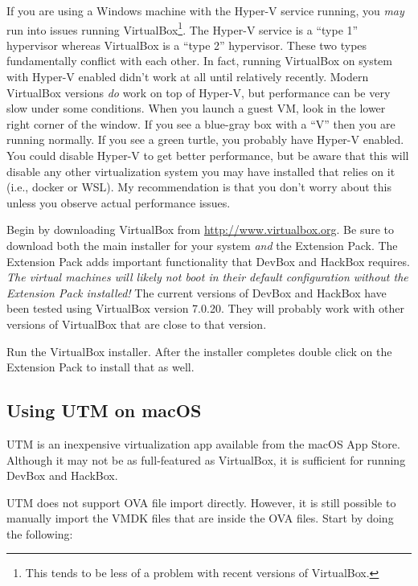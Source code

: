 \documentclass{article}
\begin{document}
If you are using a Windows machine with the Hyper-V service running, you \emph{may} run into
issues running VirtualBox\footnote{This tends to be less of a problem with recent versions of
VirtualBox.}. The Hyper-V service is a ``type 1'' hypervisor whereas VirtualBox is a ``type 2''
hypervisor. These two types fundamentally conflict with each other. In fact, running VirtualBox
on system with Hyper-V enabled didn't work at all until relatively recently. Modern VirtualBox
versions \emph{do} work on top of Hyper-V, but performance can be very slow under some
conditions. When you launch a guest VM, look in the lower right corner of the window. If you see
a blue-gray box with a ``V'' then you are running normally. If you see a green turtle, you
probably have Hyper-V enabled. You could disable Hyper-V to get better performance, but be aware
that this will disable any other virtualization system you may have installed that relies on it
(i.e., docker or WSL). My recommendation is that you don't worry about this unless you observe
actual performance issues.

Begin by downloading VirtualBox from \url{http://www.virtualbox.org}. Be sure to download both
the main installer for your system \emph{and} the Extension Pack. The Extension Pack adds
important functionality that DevBox and HackBox requires. \emph{The virtual machines will likely
not boot in their default configuration without the Extension Pack installed!} The current
versions of DevBox and HackBox have been tested using VirtualBox version 7.0.20. They will
probably work with other versions of VirtualBox that are close to that version.

Run the VirtualBox installer. After the installer completes double click on the Extension Pack
to install that as well.

\subsection{Using UTM on macOS}
\label{sec:utm-macos}

UTM is an inexpensive virtualization app available from the macOS App Store. Although it
may not be as full-featured as VirtualBox, it is sufficient for running DevBox and HackBox.

UTM does not support OVA file import directly. However, it is still possible to manually import
the VMDK files that are inside the OVA files. Start by doing the following:
\end{document}
